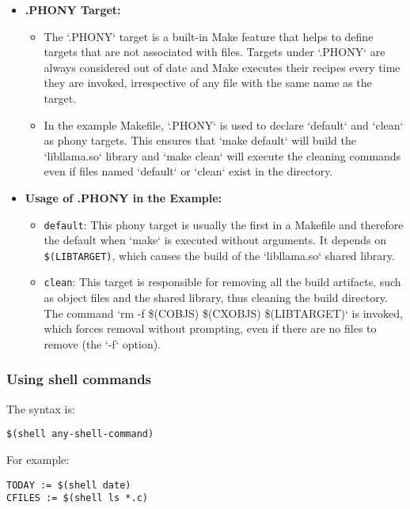 \documentclass[12pt]{article}
\begin{document}
\begin{itemize}
    \item \textbf{.PHONY Target:}
    \begin{itemize}
        \item The `.PHONY` target is a built-in Make feature that helps to define targets that are not associated with files. Targets under `.PHONY` are always considered out of date and Make executes their recipes every time they are invoked, irrespective of any file with the same name as the target.
        \item In the example Makefile, `.PHONY` is used to declare `default` and `clean` as phony targets. This ensures that `make default` will build the `libllama.so` library and `make clean` will execute the cleaning commands even if files named `default` or `clean` exist in the directory.
    \end{itemize}
    
    \item \textbf{Usage of .PHONY in the Example:}
    \begin{itemize}
        \item \texttt{default}: This phony target is usually the first in a Makefile and therefore the default when `make` is executed without arguments. It depends on \texttt{\$(LIBTARGET)}, which causes the build of the `libllama.so` shared library.
        \item \texttt{clean}: This target is responsible for removing all the build artifacts, such as object files and the shared library, thus cleaning the build directory. The command `rm -f \$(COBJS) \$(CXOBJS) \$(LIBTARGET)` is invoked, which forces removal without prompting, even if there are no files to remove (the `-f` option).
    \end{itemize}
\end{itemize}

\subsubsection{Using shell commands}

The syntax is:

\begin{verbatim}
$(shell any-shell-command)
\end{verbatim}

For example:

\begin{verbatim}
TODAY := $(shell date)
CFILES := $(shell ls *.c)
\end{verbatim}
\end{document}
